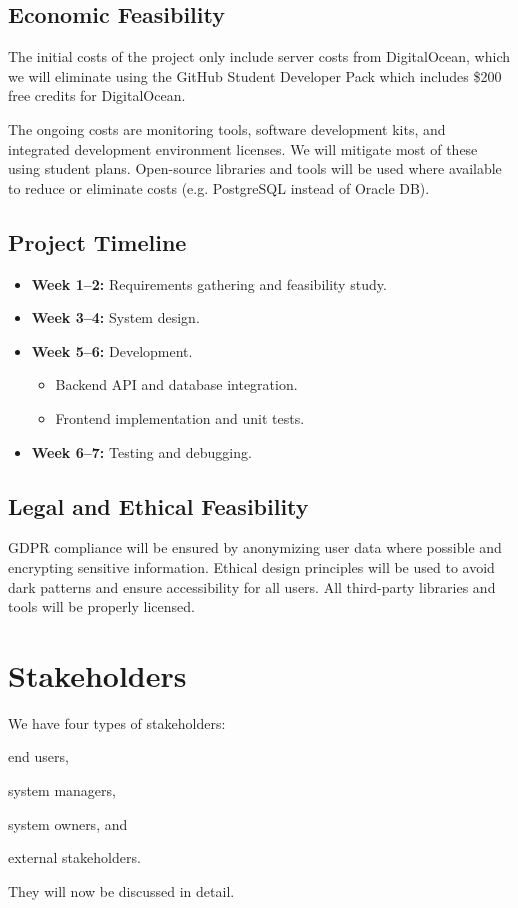 \documentclass[a4paper,journal]{IEEEtran}
\begin{document}
\subsection{Economic Feasibility}
The initial costs of the project only include server costs from DigitalOcean,
which we will eliminate using the GitHub Student Developer Pack which includes
\$200 free credits for DigitalOcean.

The ongoing costs are monitoring tools, software development kits, and
integrated development environment licenses.
We will mitigate most of these using student plans.
Open-source libraries and tools will be used where available to reduce or
eliminate costs (e.g. PostgreSQL instead of Oracle DB).

\subsection{Project Timeline}
\begin{itemize}
  \item \textbf{Week 1--2:} Requirements gathering and feasibility study.
  \item \textbf{Week 3--4:} System design.
  \item \textbf{Week 5--6:} Development.
    \begin{itemize}
      \item Backend API and database integration.
      \item Frontend implementation and unit tests.
    \end{itemize}
  \item \textbf{Week 6--7:} Testing and debugging.
\end{itemize}

\subsection{Legal and Ethical Feasibility}
GDPR compliance will be ensured by anonymizing user data where possible and
encrypting sensitive information.
Ethical design principles will be used to avoid dark patterns and ensure
accessibility for all users.
All third-party libraries and tools will be properly licensed.

\section{Stakeholders}
We have four types of stakeholders:
\begin{enumerate*}
  \item end users,
  \item system managers,
  \item system owners, and
  \item external stakeholders.
\end{enumerate*}
They will now be discussed in detail.
\end{document}
